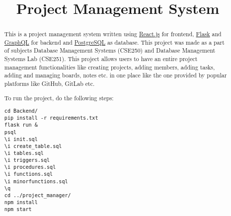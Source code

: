 \documentclass[conference,onecolumn]{IEEEtran}
\begin{document}
\title{Project Management System}

\author{
  \and
  \and
}

\maketitle

\begin{abstract}
  This is a project management system written using \href{https://reactjs.org/}{React.js} for frontend, \href{https://flask.palletsprojects.com/en/1.1.x/}{Flask} and \href{https://graphql.org/}{GraphQL} for backend and \href{https://www.postgresql.org/}{PostgreSQL} as database. This project was made as a part of subjects Database Management Systems (CSE250) and Database Management Systems Lab (CSE251). This project allows users to have an entire project management functionalities like creating projects, adding members, adding tasks, adding and managing boards, notes etc. in one place like the one provided by popular platforms like GitHub, GitLab etc.

  To run the project, do the following steps:
\begin{verbatim}
cd Backend/
pip install -r requirements.txt
flask run &
psql
\i init.sql
\i create_table.sql
\i tables.sql
\i triggers.sql
\i procedures.sql
\i functions.sql
\i minorfunctions.sql
\q
cd ../project_manager/
npm install
npm start
  \end{verbatim}
\end{abstract}

\newpage
\end{document}

